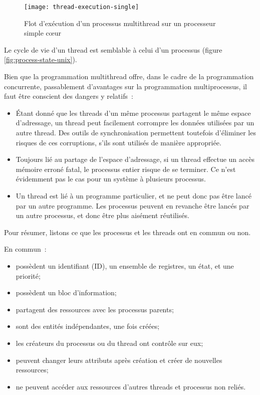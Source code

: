 \begin{figure}[ht]
  \centering
  \texttt{[image: thread-execution-single]}
  \caption{\label{fig:thread-execution-single}Flot d'exécution d'un processus multithread sur un processeur simple cœur}

\end{figure}

Le cycle de vie d'un thread est semblable à celui d'un processus (figure \ref{fig:process-state-unix}).

Bien que la programmation multithread offre, dans le cadre de la programmation concurrente, passablement d'avantages sur la programmation multiprocessus, il faut être conscient des dangers y relatifs~:

\begin{itemize}
  \item Étant donné que les threads d'un même processus partagent le même espace d'adressage, un thread peut facilement corrompre les données utilisées par un autre thread. Des outils de synchronisation permettent toutefois d'éliminer les risques de ces corruptions, s'ils sont utilisés de manière appropriée.

  \item Toujours lié au partage de l'espace d'adressage, si un thread effectue un accès mémoire erroné fatal, le processus entier risque de se terminer. Ce n'est évidemment pas le cas pour un système à plusieurs processus.

  \item Un thread est lié à un programme particulier, et ne peut donc pas être lancé par un autre programme. Les processus peuvent en revanche être lancés par un autre processus, et donc être plus aisément réutilisés.
\end{itemize}

Pour résumer, listons ce que les processus et les threads ont en commun ou non.

En commun~:
\begin{itemize}
  \item possèdent un identifiant (ID), un ensemble de registres, un état, et une priorité;
  \item possèdent un bloc d'information;
  \item partagent des ressources avec les processus parents;
  \item sont des entités indépendantes, une fois créées;
  \item les créateurs du processus ou du thread ont contrôle sur eux;
  \item peuvent changer leurs attributs après création et créer de nouvelles ressources;
  \item ne peuvent accéder aux ressources d'autres threads et processus non reliés.
\end{itemize}

